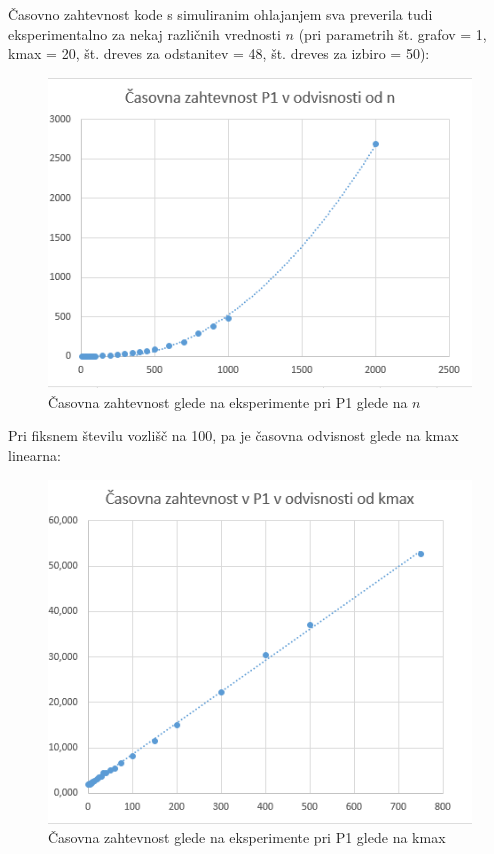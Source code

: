 \documentclass[a4paper, 12 pt]{article}
\begin{document}
\vspace{1cm}

Časovno zahtevnost kode s simuliranim ohlajanjem sva preverila tudi eksperimentalno za nekaj različnih vrednosti $n$ (pri parametrih št. grafov = 1, kmax = 20, št. dreves za odstanitev = 48, št. dreves za izbiro = 50):

\begin{figure}[H]
\centering
  \includegraphics[width=12cm]{casovna_p1_n.png}
  \caption{Časovna zahtevnost glede na eksperimente pri P1 glede na $n$}
  \label{fig:p1_časovna_zaht_n} 
\end{figure}


\vspace{1cm}

Pri fiksnem številu vozlišč na 100, pa je časovna odvisnost glede na kmax linearna:

\begin{figure}[H]
\centering
  \includegraphics[width=12cm]{casovna_p1_kmax.png}
  \caption{Časovna zahtevnost glede na eksperimente pri P1 glede na kmax}
  \label{fig:p1_časovna_zaht_kmax} 
\end{figure}
\end{document}
